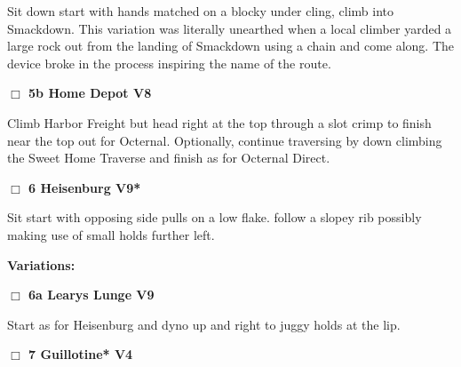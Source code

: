 \begin{multicols}{2}
\begin{adjustwidth}{0.5cm}{}
\begin{adjustwidth}{1.3em}{}
Sit down start with hands matched on a blocky under cling, climb into Smackdown. This variation was literally unearthed when a local climber yarded a large rock out from the landing of Smackdown using a chain and come along. The device broke in the process inspiring the name of the route.
\end{adjustwidth}




\needspace{2em}
\label{vr:Harbor Freight Right Exit}
\colorbox{Goldenrod!20}{
\parbox{0.95\linewidth}{
\hspace{-1ex}\textbf{$\Box$
5b Home Depot V8  
}}}
\begin{adjustwidth}{1.3em}{}			

Climb Harbor Freight but head right at the top through a slot crimp to finish near the top out for Octernal. Optionally, continue traversing by down climbing the Sweet Home Traverse and finish as for Octernal Direct.
\end{adjustwidth}



\end{adjustwidth}


\needspace{2em}
\label{rt:Heisenburg}
\colorbox{Goldenrod!20}{
\parbox{0.95\linewidth}{
\hspace{-1ex}\textbf{$\Box$
6 Heisenburg V9*  
}}}
\begin{adjustwidth}{1.3em}{}			

Sit start with opposing side pulls on a low flake. follow a slopey rib possibly making use of small holds further left.
\end{adjustwidth}


\begin{adjustwidth}{0.5cm}{}				
\needspace{4em}
\textbf{Variations:} \newline

\needspace{2em}
\label{vr:Learys Lunge}
\colorbox{Goldenrod!20}{
\parbox{0.95\linewidth}{
\hspace{-1ex}\textbf{$\Box$
6a Learys Lunge V9  
}}}
\begin{adjustwidth}{1.3em}{}			

Start as for Heisenburg and dyno up and right to juggy holds at the lip.
\end{adjustwidth}



\end{adjustwidth}


\needspace{2em}
\label{rt:Guillotine}
\colorbox{RoyalBlue!20}{
\parbox{0.95\linewidth}{
\hspace{-1ex}\textbf{$\Box$
7 Guillotine* V4  
}}}
\begin{adjustwidth}{1.3em}{}			


\end{adjustwidth}
\end{multicols}
